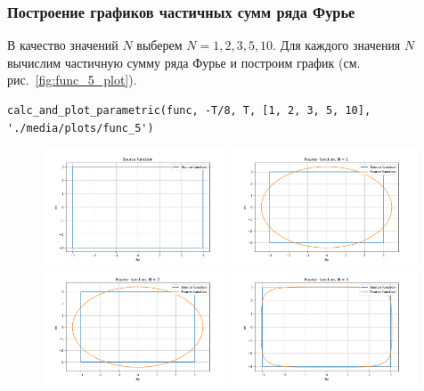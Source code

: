 \subsubsection{Построение графиков частичных сумм ряда Фурье}
В качество значений $N$ выберем $N = 1, 2, 3, 5, 10$. Для каждого значения $N$ вычислим частичную сумму ряда Фурье и построим график (см. рис.~\ref{fig:func_5_plot}).

\begin{lstlisting}[style=python_white, caption=Построение графиков частичных сумм ряда Фурье, label=lst:func_1_plot]
    calc_and_plot_parametric(func, -T/8, T, [1, 2, 3, 5, 10], './media/plots/func_5')
\end{lstlisting}

\begin{figure}[ht!]
    \centering
    \includegraphics[width=0.49\textwidth]{media/plots/func_5.png}
    \includegraphics[width=0.49\textwidth]{media/plots/func_5_N_1.png}
    \includegraphics[width=0.49\textwidth]{media/plots/func_5_N_2.png}
    \includegraphics[width=0.49\textwidth]{media/plots/func_5_N_3.png}

\end{figure}
